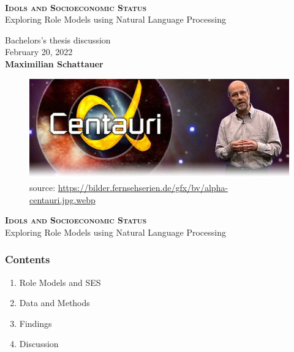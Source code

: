 



\begin{frame}
	\begin{center}
		\begin{block}
			{\centering\\
				\medskip
				\textbf{\textsc{Idols and Socioeconomic Status}}\\
                Exploring Role Models using Natural Language Processing\\
				\medskip}
		\end{block}

		\bigskip

		Bachelors's thesis discussion\\
		\medskip
		February 20, 2022\\

		\vspace{1cm}
		\textbf{Maximilian Schattauer}
	\end{center}
\end{frame}


\begin{frame}
	\begin{figure}
		\centering
		\includegraphics[scale=0.6]{img/lesch.png}
		\caption*{\tiny source: \href{https://bilder.fernsehserien.de/gfx/bv/alpha-centauri.jpg.webp}{https://bilder.fernsehserien.de/gfx/bv/alpha-centauri.jpg.webp}}
	\end{figure}
    
\end{frame}


\begin{frame}
	\begin{center}
		\textbf{\textsc{Idols and Socioeconomic Status}}\\
		Exploring Role Models using Natural Language Processing\\
	\end{center}
	\vspace{0.5cm}
    \frametitle{Contents}
    \begin{enumerate}
        \item Role Models and SES
        \item Data and Methods
        \item Findings
        \item Discussion
    \end{enumerate}
\end{frame}


